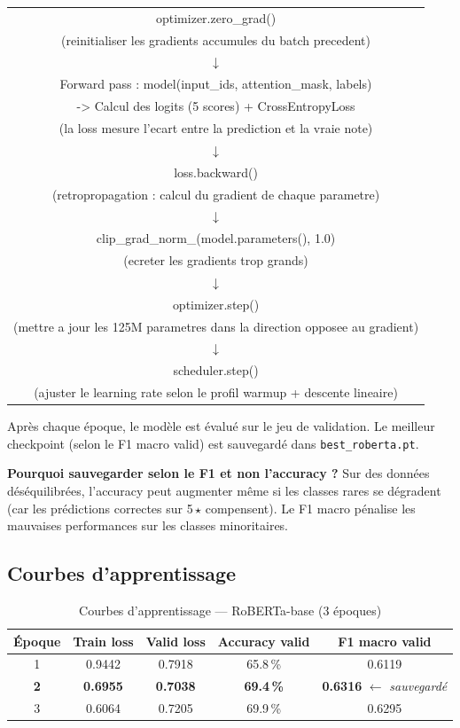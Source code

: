 \documentclass[12pt, a4paper]{article}
\begin{document}
\begin{center}
\ttfamily\small
\begin{tabular}{c}
optimizer.zero\_grad() \\
(reinitialiser les gradients accumules du batch precedent) \\
$\downarrow$ \\
Forward pass : model(input\_ids, attention\_mask, labels) \\
-> Calcul des logits (5 scores) + CrossEntropyLoss \\
(la loss mesure l'ecart entre la prediction et la vraie note) \\
$\downarrow$ \\
loss.backward() \\
(retropropagation : calcul du gradient de chaque parametre) \\
$\downarrow$ \\
clip\_grad\_norm\_(model.parameters(), 1.0) \\
(ecreter les gradients trop grands) \\
$\downarrow$ \\
optimizer.step() \\
(mettre a jour les 125M parametres dans la direction opposee au gradient) \\
$\downarrow$ \\
scheduler.step() \\
(ajuster le learning rate selon le profil warmup + descente lineaire) \\
\end{tabular}
\end{center}

Après chaque époque, le modèle est évalué sur le jeu de validation.
Le meilleur checkpoint (selon le F1 macro valid) est sauvegardé dans \texttt{best\_roberta.pt}.

\textbf{Pourquoi sauvegarder selon le F1 et non l'accuracy ?}
Sur des données déséquilibrées, l'accuracy peut augmenter même si les classes rares
se dégradent (car les prédictions correctes sur 5\,$\star$ compensent).
Le F1 macro pénalise les mauvaises performances sur les classes minoritaires.

\subsection{Courbes d'apprentissage}

\begin{table}[H]
  \centering
  \begin{tabular}{ccccc}
    \toprule
    \textbf{Époque} & \textbf{Train loss} & \textbf{Valid loss} & \textbf{Accuracy valid} & \textbf{F1 macro valid} \\
    \midrule
    1 & 0.9442 & 0.7918 & 65.8\,\% & 0.6119 \\
    \textbf{2} & \textbf{0.6955} & \textbf{0.7038} & \textbf{69.4\,\%} & \textbf{0.6316} $\leftarrow$ \textit{sauvegardé} \\
    3 & 0.6064 & 0.7205 & 69.9\,\% & 0.6295 \\
    \bottomrule
  \end{tabular}
  \caption{Courbes d'apprentissage — RoBERTa-base (3 époques)}
\end{table}
\end{document}

